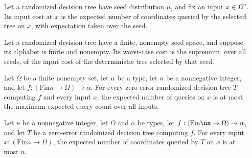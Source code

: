 \begin{definition}
\label{FABL.RandomizedDecisionTree.inputCost}
\leanok
{}
Let a randomized decision tree have seed distribution $\mu$, and fix an input $x \in
\Omega^n$. Its input cost at $x$ is the expected number of coordinates queried by the
selected tree on $x$, with expectation taken over the seed.
\end{definition}

\begin{definition}
\label{FABL.RandomizedDecisionTree.worstCaseCost}
\leanok
{}
Let a randomized decision tree have a finite, nonempty seed space, and suppose its
alphabet is finite and nonempty. Its worst-case cost is the supremum, over all seeds, of
the input cost of the deterministic tree selected by that seed.
\end{definition}

\begin{theorem}
\label{FABL.RandomizedDecisionTree.inputCost_le_worstCaseCost}
\leanok
{}
Let $\Omega$ be a finite nonempty set, let $\alpha$ be a type, let $n$ be a nonnegative
integer, and let $f:(\mathrm{Fin} n\to\Omega)\to\alpha$. For every zero-error randomized
decision tree $T$ computing $f$ and every input $x$, the expected number of queries on
$x$ is at most the maximum expected query count over all inputs.
\end{theorem}

\begin{theorem}
\label{FABL.RandomizedDecisionTree.inputCost_le_dimension}
\leanok
{}
Let $n$ be a nonnegative integer, let $\Omega$ and $\alpha$ be types, let $f:(\mathrm{Fin}\nn\to\Omega)\to\alpha$, and let $T$ be a zero-error randomized decision tree computing
$f$. For every input $x:(\mathrm{Fin} n\to\Omega)$, the expected number of coordinates queried
by $T$ on $x$ is at most $n$.
\end{theorem}

